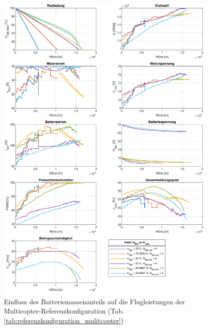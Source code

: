 \begin{figure}[H]
\centering
	\includegraphics[scale=0.70]{Diagramme/Batteriemasse.pdf}
	\caption{Einfluss des Batteriemassenanteils auf die Flugleistungen der Multicopter-Referenzkonfiguration (Tab. \ref{tab:referenzkonfiguration_mulitcopter})}
	\label{abb:batteriemasse}
\end{figure}

